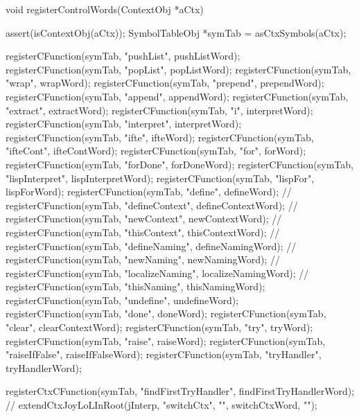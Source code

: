 \startCCode
void registerControlWords(ContextObj *aCtx) {
  assert(isContextObj(aCtx));
  SymbolTableObj *symTab = asCtxSymbols(aCtx);
  
  registerCFunction(symTab, "pushList",       pushListWord);
  registerCFunction(symTab, "popList",        popListWord);
  registerCFunction(symTab, "wrap",           wrapWord);
  registerCFunction(symTab, "prepend",        prependWord);
  registerCFunction(symTab, "append",         appendWord);
  registerCFunction(symTab, "extract",        extractWord);
  registerCFunction(symTab, "i",              interpretWord);
  registerCFunction(symTab, "interpret",      interpretWord);
  registerCFunction(symTab, "ifte",           ifteWord);
  registerCFunction(symTab, "ifteCont",       ifteContWord);
  registerCFunction(symTab, "for",            forWord);
  registerCFunction(symTab, "forDone",        forDoneWord);
  registerCFunction(symTab, "lispInterpret",  lispInterpretWord);
  registerCFunction(symTab, "lispFor",        lispForWord);
  registerCFunction(symTab, "define",         defineWord);
//  registerCFunction(symTab, "defineContext",  defineContextWord);
//  registerCFunction(symTab, "newContext",     newContextWord);
//  registerCFunction(symTab, "thisContext",    thisContextWord);
//  registerCFunction(symTab, "defineNaming",   defineNamingWord);
//  registerCFunction(symTab, "newNaming",      newNamingWord);
//  registerCFunction(symTab, "localizeNaming", localizeNamingWord);
//  registerCFunction(symTab, "thisNaming",     thisNamingWord);
  registerCFunction(symTab, "undefine",       undefineWord);
  registerCFunction(symTab, "done",           doneWord);
  registerCFunction(symTab, "clear",          clearContextWord);
  registerCFunction(symTab, "try",            tryWord);
  registerCFunction(symTab, "raise",          raiseWord);
  registerCFunction(symTab, "raiseIfFalse",   raiseIfFalseWord);
  registerCFunction(symTab, "tryHandler",     tryHandlerWord);
  
  registerCtxCFunction(symTab, "findFirstTryHandler", findFirstTryHandlerWord);
//  extendCtxJoyLoLInRoot(jInterp, "switchCtx",           "", switchCtxWord,           "");
}
\stopCCode
